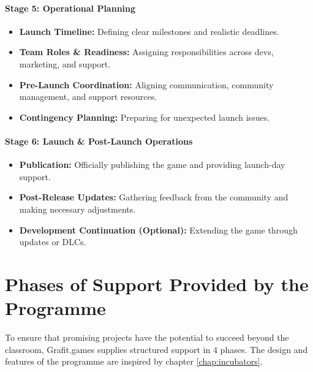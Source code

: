 \paragraph{\large Stage 5: Operational Planning}
\begin{itemize}
    \item \textbf{Launch Timeline:} Defining clear milestones and realistic deadlines.
    \item \textbf{Team Roles \& Readiness:} Assigning responsibilities across devs, marketing, and support.
    \item \textbf{Pre-Launch Coordination:} Aligning communication, community management, and support resources.
    \item \textbf{Contingency Planning:} Preparing for unexpected launch issues.
\end{itemize}
\paragraph{\large Stage 6: Launch \& Post-Launch Operations}
\begin{itemize}
    \item \textbf{Publication:} Officially publishing the game and providing launch-day support.
    \item \textbf{Post-Release Updates:} Gathering feedback from the community and making necessary adjustments.
    \item \textbf{Development Continuation (Optional):} Extending the game through updates or DLCs.
\end{itemize}

\section{Phases of Support Provided by the Programme}
To ensure that promising projects have the potential to succeed beyond the classroom, Grafit.games supplies structured support in 4 phases. The design and features of the programme are inspired by chapter \ref{chap:incubators}.


